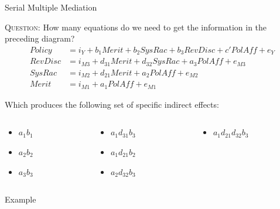 \documentclass{beamer}
\begin{document}
\begin{frame}{Serial Multiple Mediation}
  
  \textsc{Question:} How many equations do we need to get the
  information in the preceding diagram?
  \pause
  \begin{align*}
    Policy &= i_Y + b_1 Merit + b_2 SysRac + b_3 RevDisc + c' PolAff + e_Y\\
    RevDisc &= i_{M3} + d_{31} Merit + d_{32} SysRac + a_3 PolAff + e_{M3}\\
    SysRac &= i_{M2} + d_{21} Merit + a_2 PolAff + e_{M2}\\
    Merit &= i_{M1} + a_1 PolAff + e_{M1}
  \end{align*}
  
  Which produces the following set of specific indirect effects:
  \begin{columns}
    
    \begin{column}{0.33\textwidth}
      \begin{itemize}
      \item $a_1b_1$
      \item $a_2b_2$
      \item $a_3b_3$
      \end{itemize}
    \end{column}
  
    \begin{column}{0.33\textwidth}
      \begin{itemize}
      \item $a_1d_{31}b_3$
      \item $a_1d_{21}b_2$
      \item $a_2d_{32}b_3$
      \end{itemize}
    \end{column}
    
    \begin{column}{0.33\textwidth}
      \begin{itemize}
      \item $a_1d_{21}d_{32}b_3$
      \end{itemize}
    \end{column}
    
  \end{columns}
  
\end{frame}


\begin{frame}[allowframebreaks]{Example}
    


\end{frame}
\end{document}
